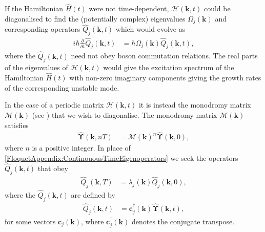 If the Hamiltonian $\hat{H}(t)$ were not time-dependent, $\mathcal{H}(\bm{k}, t)$ could be diagonalised to find the (potentially complex) eigenvalues $\Omega_j(\bm{k})$ and corresponding operators $\hat{Q}_j(\bm{k}, t)$ which would evolve as
\begin{align}
    \label{FloquetAppendix:ContinouousTimeEigenoperators}
    i \hbar \frac{\partial }{\partial t}\hat{Q}_j(\bm{k}, t) &= \hbar \Omega_j(\bm{k}) \hat{Q}_j(\bm{k}, t),
\end{align}
where the $\hat{Q}_j(\bm{k}, t)$ need not obey boson commutation relations. The real parts of the eigenvalues of $\mathcal{H}(\bm{k}, t)$ would give the excitation spectrum of the Hamiltonian $\hat{H}(t)$ with non-zero imaginary components giving the growth rates of the corresponding unstable mode.

In the case of a periodic matrix $\mathcal{H}(\bm{k}, t)$ it is instead the monodromy matrix $\mathcal{M}(\bm{k})$ (see ) that we wish to diagonalise. The monodromy matrix $\mathcal{M}(\bm{k})$ satisfies
\begin{align}
    \label{FloquetAppendix:MonodromyMatrix}
    \hat{\bm{\Upsilon}}(\bm{k}, nT) &= \mathcal{M}(\bm{k})^n \hat{\bm{\Upsilon}}(\bm{k}, 0),
\end{align}
where $n$ is a positive integer. In place of \eqref{FloquetAppendix:ContinouousTimeEigenoperators} we seek the operators $\hat{Q}_j(\bm{k}, t)$ that obey
\begin{align}
    \label{FloquetAppendix:QOperatorEvolution}
    \hat{Q}_j(\bm{k}, T) &= \lambda_j(\bm{k}) \hat{Q}_j(\bm{k}, 0),
\end{align}
where the $\hat{Q}_j(\bm{k}, t)$ are defined by
\begin{align}
    \label{FloquetAppendix:QOperatorDefinition}
    \hat{Q}_j(\bm{k}, t) &= \bm{c}_j^\dagger(\bm{k}) \hat{\bm{\Upsilon}}(\bm{k}, t),
\end{align}
for some vectors $\bm{c}_j(\bm{k})$, where $\bm{c}_j^\dagger(\bm{k})$ denotes the conjugate transpose. 

